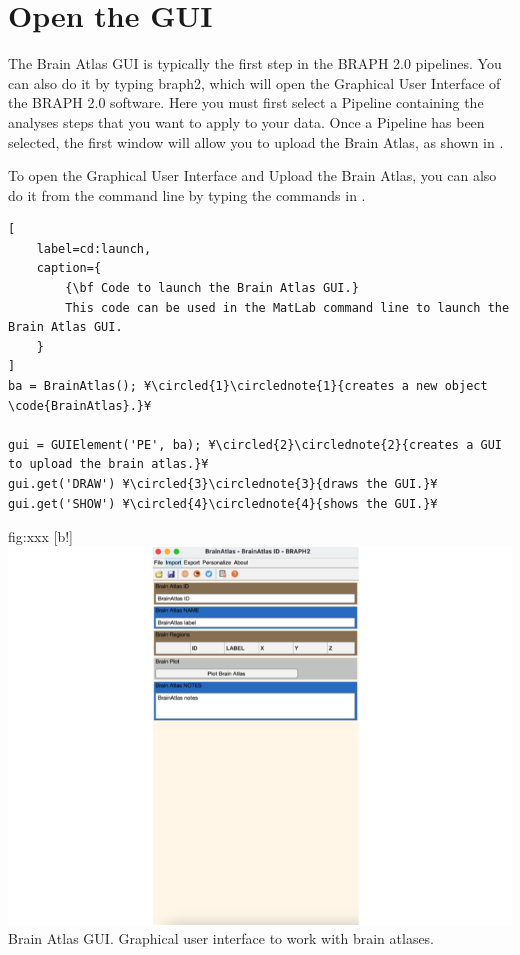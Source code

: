 \documentclass{tufte-handout}
\begin{document}
\clearpage
\section{Open the GUI}

The Brain Atlas GUI is typically the first step in the BRAPH 2.0 pipelines. You can also do it by typing braph2, which will open the Graphical User Interface of the BRAPH 2.0 software. Here you must first select a Pipeline containing the analyses steps that you want to apply to your data. Once a Pipeline has been selected, the first window will allow you to upload the Brain Atlas, as shown in \Figref{}.

To open the Graphical User Interface and Upload the Brain Atlas, you can also do it from the command line by typing the commands in .
%
\begin{lstlisting}[
	label=cd:launch,
	caption={
		{\bf Code to launch the Brain Atlas GUI.}
		This code can be used in the MatLab command line to launch the  Brain Atlas GUI.
	}
]
ba = BrainAtlas(); ¥\circled{1}\circlednote{1}{creates a new object \code{BrainAtlas}.}¥

gui = GUIElement('PE', ba); ¥\circled{2}\circlednote{2}{creates a GUI to upload the brain atlas.}¥
gui.get('DRAW') ¥\circled{3}\circlednote{3}{draws the GUI.}¥
gui.get('SHOW') ¥\circled{4}\circlednote{4}{shows the GUI.}¥
\end{lstlisting}

	{fig:xxx}
	{
	[b!]
	\includegraphics{tut_ba/fig7.png}
	}
	{Brain Atlas GUI.}
	{
	Graphical user interface to work with brain atlases. 
	}
\end{document}
